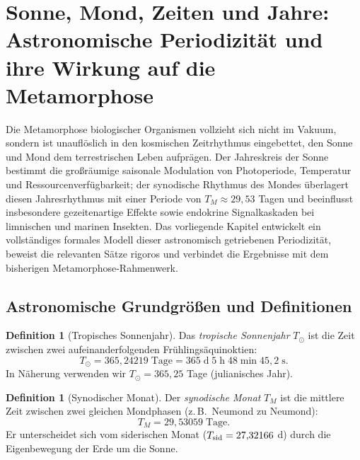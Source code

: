 ﻿\documentclass[12pt, a4paper]{article}
\theoremstyle{definition}
\newtheorem{definition}[theorem]{Definition}
\begin{document}

\section{Sonne, Mond, Zeiten und Jahre: Astronomische Periodizität und ihre
  Wirkung auf die Metamorphose}\label{sec:astronomie}

Die Metamorphose biologischer Organismen vollzieht sich nicht im Vakuum, sondern
ist unauflöslich in den kosmischen Zeitrhythmus eingebettet, den Sonne und Mond
dem terrestrischen Leben aufprägen. Der Jahreskreis der Sonne bestimmt die
großräumige saisonale Modulation von Photoperiode, Temperatur und Ressourcen\-verfügbarkeit;
der synodische Rhythmus des Mondes überlagert diesen Jahresrhythmus mit einer
Periode von $T_M \approx 29{,}53$ Tagen und beeinflusst insbesondere gezeitenartige
Effekte sowie endokrine Signalkaskaden bei limnischen und marinen Insekten. Das
vorliegende Kapitel entwickelt ein vollständiges formales Modell dieser astronomisch
getriebenen Periodizität, beweist die relevanten Sätze rigoros und verbindet
die Ergebnisse mit dem bisherigen Metamorphose-Rahmenwerk.

\subsection{Astronomische Grundgrößen und Definitionen}

\begin{definition}[Tropisches Sonnenjahr]\label{def:sonnenjahr}
Das \emph{tropische Sonnenjahr} $T_{\odot}$ ist die Zeit zwischen zwei aufeinander\-folgenden
Frühlingsäquinoktien:
\[
  T_{\odot} = 365{,}24219\;\text{Tage} = 365\;\text{d}\;5\;\text{h}\;48\;\text{min}\;45{,}2\;\text{s}.
\]
In Näherung verwenden wir $T_{\odot} = 365{,}25$ Tage (julianisches Jahr).
\end{definition}

\begin{definition}[Synodischer Monat]\label{def:synodisch}
Der \emph{synodische Monat} $T_M$ ist die mittlere Zeit zwischen zwei gleichen
Mondphasen (z.\,B.\ Neumond zu Neumond):
\[
  T_M = 29{,}53059\;\text{Tage}.
\]
Er unterscheidet sich vom siderischen Monat ($T_{\rm sid} = 27{,}32166$ d) durch
die Eigenbewegung der Erde um die Sonne.
\end{definition}
\end{document}

